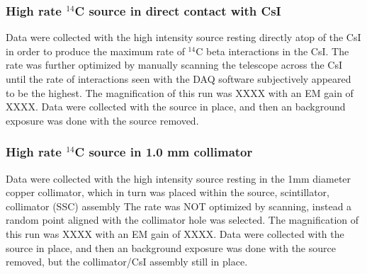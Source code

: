 \documentclass[11pt]{article}
\newcommand{\nuc}[2]{\ensuremath{^{#1}}#2}
\begin{document}
\subsubsection{High rate \nuc{14}{C} source in direct contact with CsI} 
Data were collected with the high intensity source resting directly atop of the CsI in order to produce the maximum rate of \nuc{14}{C} beta interactions in the CsI. The rate was further optimized by manually scanning the telescope  across the CsI until the rate of interactions seen with the DAQ software subjectively appeared to be the highest. The magnification of this run was XXXX with an EM gain of XXXX. 
Data were collected with the source in place, and then an background exposure was done with the source removed. 

\subsubsection{High rate \nuc{14}{C} source in 1.0 mm collimator} 
Data were collected with the high intensity source resting in the 1mm diameter copper collimator, which in turn was placed within the source, scintillator, collimator (SSC) assembly
The rate was NOT optimized by scanning,
instead a random point aligned with the collimator hole was selected. The magnification of this run was XXXX with an EM gain of XXXX. 
Data were collected with the source in place, and then an background exposure was done with the source removed, but the collimator/CsI assembly still in place. 

\end{document}
